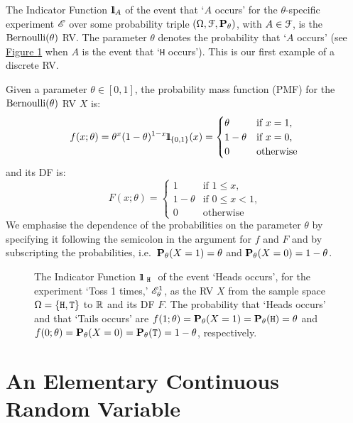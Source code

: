 The Indicator Function ${1}\mspace{-11 mu}{1}_A$ of the event that `$A$ occurs' for the $\theta$-specific experiment $\mathscr{E}$ over some probability triple $(\Omega,\mathcal{F},\mathbf{P}_{\theta})$, with $A \in \mathcal{F}$, is the $\bernoulli(\theta)$ RV.  The parameter $\theta$ denotes the probability that `$A$ occurs' (see \hyperref[F:RVt1T]{Figure \ref*{F:RVt1T}} when $A$ is the event that `{\tt H} occurs').  This is our first example of a discrete RV.

\begin{model}[$\bernoulli(\theta)$]
Given a parameter $\theta \in [0,1]$, the probability mass function (PMF) for the $\bernoulli(\theta)$ RV $X$ is:
\begin{equation}\label{E:Bernoullipdf}
f(x;\theta)= \theta^x (1-\theta)^{1-x} {1}\mspace{-11 mu}{1}_{\{0,1\}}(x) =
\begin{cases}
\theta & \text{if $x=1$,}\\
1-\theta & \text{if $x=0$,}\\
0 & \text{otherwise}
\end{cases}
\end{equation}
and its DF is:
\begin{equation}
F(x;\theta) =
\begin{cases}
1 & \text{if $1 \leq x$,}\\
1-\theta & \text{if $0 \leq x < 1$,}\\
0 & \text{otherwise}
\end{cases}
\end{equation}
We emphasise the dependence of the probabilities on the parameter $\theta$ by specifying it following the semicolon in the argument for $f$ and $F$ and by subscripting the probabilities, i.e.~$\mathbf{P}_{\theta}(X=1)=\theta$ and $\mathbf{P}_{\theta}(X=0)=1-\theta$.
\end{model}
\begin{figure}[htpb]
\caption{The Indicator Function $\BB{1}_{ \ {\tt H} \ }$ of the event `Heads occurs', for the experiment `Toss 1 times,' $\mathscr{E}_{\theta}^{1}$, as the RV $X$ from the sample space $\Omega = \{ {\tt H}, {\tt T}\}$ to $\mathbb{R}$ and its DF $F$.  The probability that `Heads occurs' and that `Tails occurs' are $f(1;\theta)=\mathbf{P}_{\theta}(X=1) = \mathbf{P}_{\theta}({\tt H})=\theta$ and $f(0;\theta)=\mathbf{P}_{\theta}(X=0)=\mathbf{P}_{\theta}({\tt T})=1-\theta$, respectively.\label{F:RVt1T}}
\centering   {}
\end{figure}

\section{An Elementary Continuous Random Variable}\label{S:ElemContRV}

